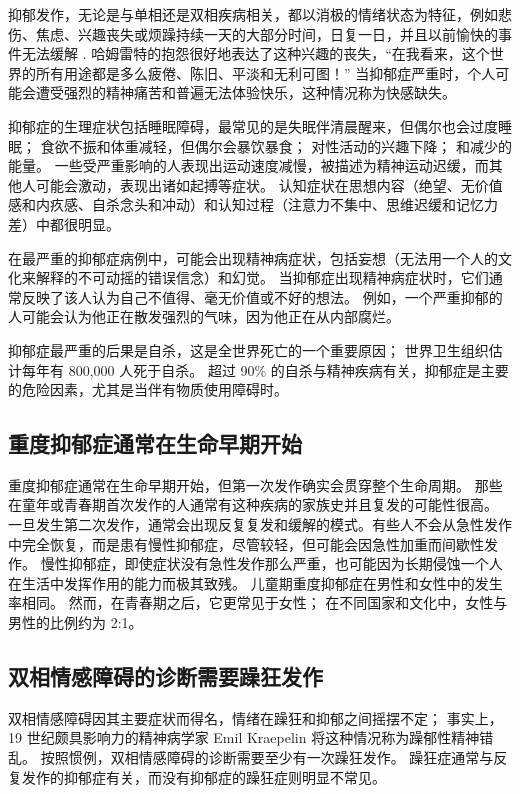 抑郁发作，无论是与单相还是双相疾病相关，都以消极的情绪状态为特征，例如悲伤、焦虑、兴趣丧失或烦躁持续一天的大部分时间，日复一日，并且以前愉快的事件无法缓解 . 哈姆雷特的抱怨很好地表达了这种兴趣的丧失，“在我看来，这个世界的所有用途都是多么疲倦、陈旧、平淡和无利可图！” 当抑郁症严重时，个人可能会遭受强烈的精神痛苦和普遍无法体验快乐，这种情况称为快感缺失。

抑郁症的生理症状包括睡眠障碍，最常见的是失眠伴清晨醒来，但偶尔也会过度睡眠； 食欲不振和体重减轻，但偶尔会暴饮暴食； 对性活动的兴趣下降； 和减少的能量。 一些受严重影响的人表现出运动速度减慢，被描述为精神运动迟缓，而其他人可能会激动，表现出诸如起搏等症状。 认知症状在思想内容（绝望、无价值感和内疚感、自杀念头和冲动）和认知过程（注意力不集中、思维迟缓和记忆力差）中都很明显。

在最严重的抑郁症病例中，可能会出现精神病症状，包括妄想（无法用一个人的文化来解释的不可动摇的错误信念）和幻觉。 当抑郁症出现精神病症状时，它们通常反映了该人认为自己不值得、毫无价值或不好的想法。 例如，一个严重抑郁的人可能会认为他正在散发强烈的气味，因为他正在从内部腐烂。

抑郁症最严重的后果是自杀，这是全世界死亡的一个重要原因； 世界卫生组织估计每年有 800,000 人死于自杀。 超过 90\% 的自杀与精神疾病有关，抑郁症是主要的危险因素，尤其是当伴有物质使用障碍时。

\subsection{重度抑郁症通常在生命早期开始}
重度抑郁症通常在生命早期开始，但第一次发作确实会贯穿整个生命周期。 那些在童年或青春期首次发作的人通常有这种疾病的家族史并且复发的可能性很高。 一旦发生第二次发作，通常会出现反复复发和缓解的模式。有些人不会从急性发作中完全恢复，而是患有慢性抑郁症，尽管较轻，但可能会因急性加重而间歇性发作。 慢性抑郁症，即使症状没有急性发作那么严重，也可能因为长期侵蚀一个人在生活中发挥作用的能力而极其致残。 儿童期重度抑郁症在男性和女性中的发生率相同。 然而，在青春期之后，它更常见于女性； 在不同国家和文化中，女性与男性的比例约为 2:1。

\subsection{双相情感障碍的诊断需要躁狂发作}

双相情感障碍因其主要症状而得名，情绪在躁狂和抑郁之间摇摆不定； 事实上，19 世纪颇具影响力的精神病学家 Emil Kraepelin 将这种情况称为躁郁性精神错乱。 按照惯例，双相情感障碍的诊断需要至少有一次躁狂发作。 躁狂症通常与反复发作的抑郁症有关，而没有抑郁症的躁狂症则明显不常见。

